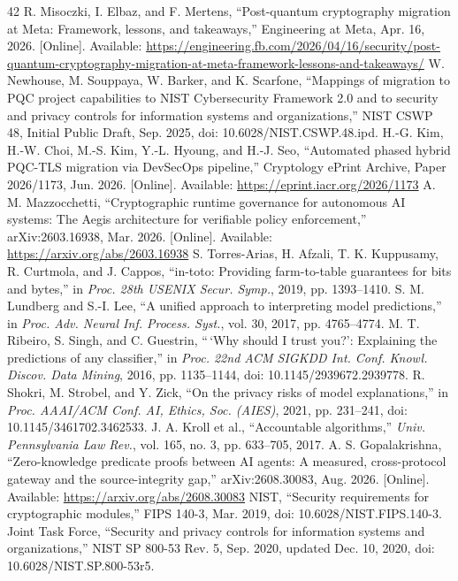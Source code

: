 \begin{thebibliography}{42}
R. Misoczki, I. Elbaz, and F. Mertens, ``Post-quantum cryptography migration at Meta: Framework, lessons, and takeaways,'' Engineering at Meta, Apr. 16, 2026. [Online]. Available: \url{https://engineering.fb.com/2026/04/16/security/post-quantum-cryptography-migration-at-meta-framework-lessons-and-takeaways/}
W. Newhouse, M. Souppaya, W. Barker, and K. Scarfone, ``Mappings of migration to PQC project capabilities to NIST Cybersecurity Framework 2.0 and to security and privacy controls for information systems and organizations,'' NIST CSWP 48, Initial Public Draft, Sep. 2025, doi: 10.6028/NIST.CSWP.48.ipd.
H.-G. Kim, H.-W. Choi, M.-S. Kim, Y.-L. Hyoung, and H.-J. Seo, ``Automated phased hybrid PQC-TLS migration via DevSecOps pipeline,'' Cryptology ePrint Archive, Paper 2026/1173, Jun. 2026. [Online]. Available: \url{https://eprint.iacr.org/2026/1173}
A. M. Mazzocchetti, ``Cryptographic runtime governance for autonomous AI systems: The Aegis architecture for verifiable policy enforcement,'' arXiv:2603.16938, Mar. 2026. [Online]. Available: \url{https://arxiv.org/abs/2603.16938}
S. Torres-Arias, H. Afzali, T. K. Kuppusamy, R. Curtmola, and J. Cappos, ``in-toto: Providing farm-to-table guarantees for bits and bytes,'' in \emph{Proc. 28th USENIX Secur. Symp.}, 2019, pp. 1393--1410.
S. M. Lundberg and S.-I. Lee, ``A unified approach to interpreting model predictions,'' in \emph{Proc. Adv. Neural Inf. Process. Syst.}, vol. 30, 2017, pp. 4765--4774.
M. T. Ribeiro, S. Singh, and C. Guestrin, ``\,`Why should I trust you?': Explaining the predictions of any classifier,'' in \emph{Proc. 22nd ACM SIGKDD Int. Conf. Knowl. Discov. Data Mining}, 2016, pp. 1135--1144, doi: 10.1145/2939672.2939778.
R. Shokri, M. Strobel, and Y. Zick, ``On the privacy risks of model explanations,'' in \emph{Proc. AAAI/ACM Conf. AI, Ethics, Soc. (AIES)}, 2021, pp. 231--241, doi: 10.1145/3461702.3462533.
J. A. Kroll et al., ``Accountable algorithms,'' \emph{Univ. Pennsylvania Law Rev.}, vol. 165, no. 3, pp. 633--705, 2017.
A. S. Gopalakrishna, ``Zero-knowledge predicate proofs between AI agents: A measured, cross-protocol gateway and the source-integrity gap,'' arXiv:2608.30083, Aug. 2026. [Online]. Available: \url{https://arxiv.org/abs/2608.30083}
NIST, ``Security requirements for cryptographic modules,'' FIPS 140-3, Mar. 2019, doi: 10.6028/NIST.FIPS.140-3.
Joint Task Force, ``Security and privacy controls for information systems and organizations,'' NIST SP 800-53 Rev. 5, Sep. 2020, updated Dec. 10, 2020, doi: 10.6028/NIST.SP.800-53r5.

\end{thebibliography}
